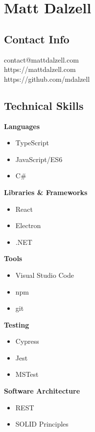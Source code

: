 \documentclass[12pt]{article}
\begin{document}

\section*{Matt Dalzell}

\setlength{\columnsep}{4em}
\setlength{\columnseprule}{0.1pt}
\begin{paracol}{2}

\subsection*{Contact Info}
contact@mattdalzell.com \\ 
https://mattdalzell.com \\
https://github.com/mdalzell

\subsection*{Technical Skills} 

\textbf{Languages}
\begin{itemize}
    \item TypeScript 
    \item JavaScript/ES6
    \item C\#
\end{itemize}

\noindent \textbf{Libraries \& Frameworks}
\begin{itemize}
    \item React 
    \item Electron
    \item .NET 
\end{itemize}

\noindent \textbf{Tools}
\begin{itemize}
    \item Visual Studio Code
    \item npm
    \item git
\end{itemize}

\noindent \textbf{Testing}
\begin{itemize}
    \item Cypress
    \item Jest
    \item MSTest
\end{itemize}

\noindent \textbf{Software Architecture}
\begin{itemize}
    \item REST
    \item SOLID Principles
\end{itemize}


\end{paracol}
\end{document}
